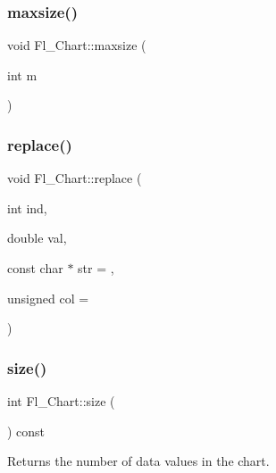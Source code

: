 \subsubsection{\texorpdfstring{maxsize()}{maxsize()}\hspace{0.1cm}{\footnotesize\ttfamily [2/2]}}
{\footnotesize\ttfamily void Fl\+\_\+\+Chart\+::maxsize (\begin{DoxyParamCaption}\item[{int}]{m }\end{DoxyParamCaption})}

\mbox{\label{class_fl___chart_aaa2b08e9822cee55f318e925603eb451}} 
\subsubsection{\texorpdfstring{replace()}{replace()}}
{\footnotesize\ttfamily void Fl\+\_\+\+Chart\+::replace (\begin{DoxyParamCaption}\item[{int}]{ind,  }\item[{double}]{val,  }\item[{const char $\ast$}]{str = {},  }\item[{unsigned}]{col = {} }\end{DoxyParamCaption})}

\mbox{\label{class_fl___chart_a1c621c042c6f273e1c2243351e4afba6}} 
\subsubsection{\texorpdfstring{size()}{size()}\hspace{0.1cm}{\footnotesize\ttfamily [1/2]}}
{\footnotesize\ttfamily int Fl\+\_\+\+Chart\+::size (\begin{DoxyParamCaption}{ }\end{DoxyParamCaption}) const\hspace{0.3cm}{\ttfamily [inline]}}

Returns the number of data values in the chart. \mbox{\label{class_fl___chart_a50625e04f40e8c30d4ee6e62699c5731}} 
